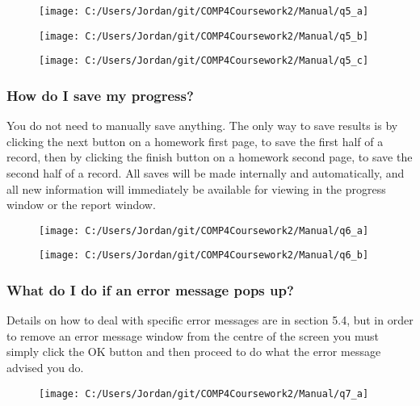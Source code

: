 \begin{figure}[H]
    \texttt{[image: C:/Users/Jordan/git/COMP4Coursework2/Manual/q5\_a]}
\end{figure}

\begin{figure}[H]
    \texttt{[image: C:/Users/Jordan/git/COMP4Coursework2/Manual/q5\_b]}
\end{figure}

\begin{figure}[H]
    \texttt{[image: C:/Users/Jordan/git/COMP4Coursework2/Manual/q5\_c]}
\end{figure}

\subsubsection{How do I save my progress?}

You do not need to manually save anything. The only way to save results is by clicking the next button on a homework first page, to save the first half of a record, then by clicking the finish button on a homework second page, to save the second half of a record. All saves will be made internally and automatically, and all new information will immediately be available for viewing in the progress window or the report window.

\begin{figure}[H]
    \texttt{[image: C:/Users/Jordan/git/COMP4Coursework2/Manual/q6\_a]}
\end{figure}

\begin{figure}[H]
    \texttt{[image: C:/Users/Jordan/git/COMP4Coursework2/Manual/q6\_b]}
\end{figure}

\subsubsection{What do I do if an error message pops up?}

Details on how to deal with specific error messages are in section 5.4, but in order to remove an error message window from the centre of the screen you must simply click the OK button and then proceed to do what the error message advised you do.

\begin{figure}[H]
    \texttt{[image: C:/Users/Jordan/git/COMP4Coursework2/Manual/q7\_a]}
\end{figure}

